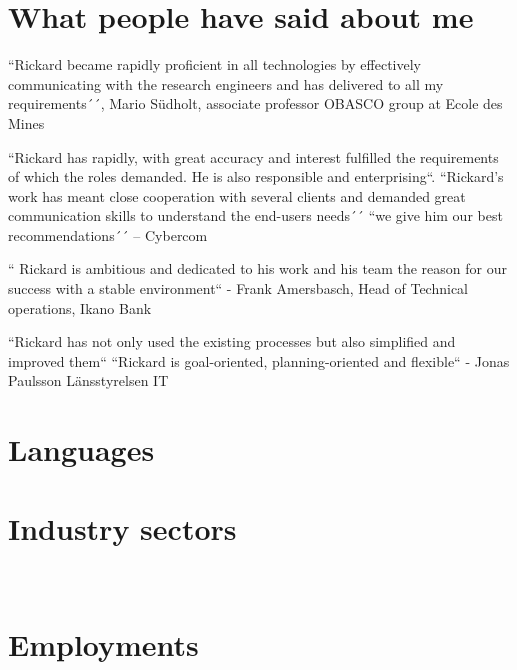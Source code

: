 \documentclass[11pt,a4paper,sans]{moderncv}
\begin{document}
{\section{What people have said about me}
\large 

\begin{quotelist}
    \item
    ``Rickard became rapidly proficient in all technologies by effectively communicating with the research engineers and has delivered to all my requirements´´,
      Mario Südholt, associate professor OBASCO group at Ecole des Mines 
\item
        ``Rickard has rapidly, with great accuracy and interest fulfilled the requirements of which the roles demanded.  He is also responsible and enterprising``. ``Rickard’s work has meant close cooperation with several clients and demanded great communication skills to understand the end-users needs´´ 
        ``we give him our best recommendations´´ – Cybercom 
\item     
        `` Rickard is ambitious and dedicated to his work and his team the reason for our success with a stable environment``  - Frank Amersbasch, Head of Technical operations, Ikano Bank 
\item  ``Rickard has not only used the existing processes but also simplified and improved them`` ``Rickard is goal-oriented, planning-oriented and flexible``  - Jonas Paulsson Länsstyrelsen IT 
       
  \end{quotelist}

\section{Languages}

\section{Industry sectors}

\

\section{Employments}
}
\end{document}
